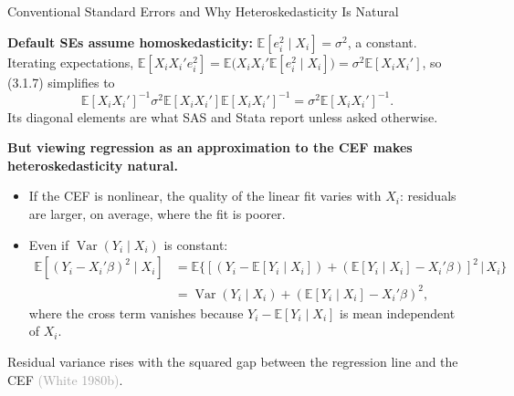 \documentclass[aspectratio=169,11pt]{beamer}
\newcommand{\E}{\mathbb{E}}
\newcommand{\Var}{\operatorname{Var}}
\newcommand{\Src}[1]{{\scriptsize\textcolor{DarkGray}{#1}}}
\begin{document}
\begin{frame}{Conventional Standard Errors and Why Heteroskedasticity Is Natural}
\small

\textbf{Default SEs assume homoskedasticity:} $\E[e_i^2\mid X_i]=\sigma^2$,
a constant. Iterating expectations,
$\E[X_iX_i'e_i^2]=\E\big(X_iX_i'\E[e_i^2\mid X_i]\big)=\sigma^2\E[X_iX_i']$,
so (3.1.7) simplifies to
\[
\E[X_iX_i']^{-1}\sigma^2\E[X_iX_i']\E[X_iX_i']^{-1}
= \sigma^2\E[X_iX_i']^{-1}.
\tag{3.1.8}
\]
Its diagonal elements are what SAS and Stata report unless asked otherwise.

\smallskip

\textbf{But viewing regression as an approximation to the CEF makes
heteroskedasticity natural.}
\begin{itemize}
    \item If the CEF is nonlinear, the quality of the linear fit varies with
    $X_i$: residuals are larger, on average, where the fit is poorer.
    \item Even if $\Var(Y_i\mid X_i)$ is constant:
    \[
    \begin{aligned}
    \E[(Y_i-X_i'\beta)^2\mid X_i]
    &= \E\big\{[(Y_i-\E[Y_i\mid X_i])+(\E[Y_i\mid X_i]-X_i'\beta)]^2\,\big|\,X_i\big\}\\
    &= \Var(Y_i\mid X_i)+(\E[Y_i\mid X_i]-X_i'\beta)^2,
    \end{aligned}
    \tag{3.1.9}
    \]
    where the cross term vanishes because $Y_i-\E[Y_i\mid X_i]$ is mean
    independent of $X_i$.
\end{itemize}

\begin{block}{}
Residual variance rises with the \alert{squared gap between the regression
line and the CEF} \Src{(White 1980b)}.
\end{block}

\end{frame}
\end{document}
